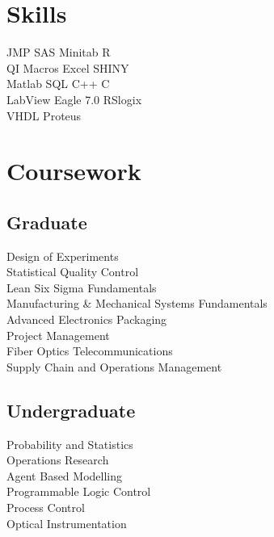 \documentclass[]{bigfatnoob-resume}
\begin{document}
\begin{minipage}[t]{0.33\textwidth}

\section{Skills}
JMP SAS \textbullet{} Minitab \textbullet{} R \\ 
QI Macros \textbullet{} Excel \textbullet{} SHINY \\
Matlab \textbullet{} SQL \textbullet{} C++ \textbullet{} C\\
LabView \textbullet{} Eagle 7.0 \textbullet{} RSlogix \\
VHDL \textbullet{} Proteus
\sectionsep


\section{Coursework}
\subsection{Graduate}
Design of Experiments \\
Statistical Quality Control\\
Lean Six Sigma Fundamentals \\
Manufacturing \& Mechanical Systems Fundamentals\\
Advanced Electronics Packaging \\
Project Management \\
Fiber Optics Telecommunications \\
Supply Chain and Operations Management \\



\sectionsep

\subsection{Undergraduate}
Probability and Statistics\\
Operations Research \\
Agent Based Modelling \\
Programmable Logic Control \\
Process Control\\
Optical Instrumentation\\

\sectionsep

%
%

\end{minipage} 
\end{document}
